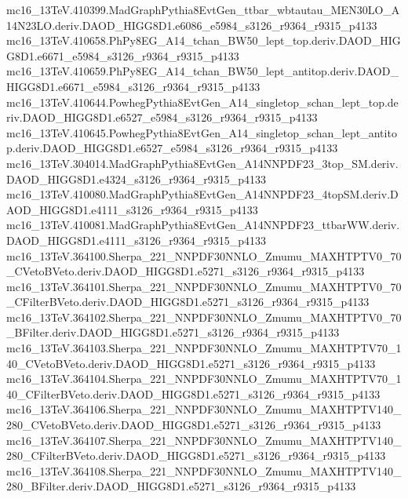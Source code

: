 \begin{footnotesize}
mc16\_13TeV.410399.MadGraphPythia8EvtGen\_ttbar\_wbtautau\_MEN30LO\_A14N23LO.deriv.DAOD\_HIGG8D1.e6086\_e5984\_s3126\_r9364\_r9315\_p4133 \\
mc16\_13TeV.410658.PhPy8EG\_A14\_tchan\_BW50\_lept\_top.deriv.DAOD\_HIGG8D1.e6671\_e5984\_s3126\_r9364\_r9315\_p4133 \\
mc16\_13TeV.410659.PhPy8EG\_A14\_tchan\_BW50\_lept\_antitop.deriv.DAOD\_HIGG8D1.e6671\_e5984\_s3126\_r9364\_r9315\_p4133 \\
mc16\_13TeV.410644.PowhegPythia8EvtGen\_A14\_singletop\_schan\_lept\_top.deriv.DAOD\_HIGG8D1.e6527\_e5984\_s3126\_r9364\_r9315\_p4133 \\
mc16\_13TeV.410645.PowhegPythia8EvtGen\_A14\_singletop\_schan\_lept\_antitop.deriv.DAOD\_HIGG8D1.e6527\_e5984\_s3126\_r9364\_r9315\_p4133 \\
mc16\_13TeV.304014.MadGraphPythia8EvtGen\_A14NNPDF23\_3top\_SM.deriv.DAOD\_HIGG8D1.e4324\_s3126\_r9364\_r9315\_p4133 \\
mc16\_13TeV.410080.MadGraphPythia8EvtGen\_A14NNPDF23\_4topSM.deriv.DAOD\_HIGG8D1.e4111\_s3126\_r9364\_r9315\_p4133 \\
mc16\_13TeV.410081.MadGraphPythia8EvtGen\_A14NNPDF23\_ttbarWW.deriv.DAOD\_HIGG8D1.e4111\_s3126\_r9364\_r9315\_p4133 \\
mc16\_13TeV.364100.Sherpa\_221\_NNPDF30NNLO\_Zmumu\_MAXHTPTV0\_70\_CVetoBVeto.deriv.DAOD\_HIGG8D1.e5271\_s3126\_r9364\_r9315\_p4133 \\
mc16\_13TeV.364101.Sherpa\_221\_NNPDF30NNLO\_Zmumu\_MAXHTPTV0\_70\_CFilterBVeto.deriv.DAOD\_HIGG8D1.e5271\_s3126\_r9364\_r9315\_p4133 \\
mc16\_13TeV.364102.Sherpa\_221\_NNPDF30NNLO\_Zmumu\_MAXHTPTV0\_70\_BFilter.deriv.DAOD\_HIGG8D1.e5271\_s3126\_r9364\_r9315\_p4133 \\
mc16\_13TeV.364103.Sherpa\_221\_NNPDF30NNLO\_Zmumu\_MAXHTPTV70\_140\_CVetoBVeto.deriv.DAOD\_HIGG8D1.e5271\_s3126\_r9364\_r9315\_p4133 \\
mc16\_13TeV.364104.Sherpa\_221\_NNPDF30NNLO\_Zmumu\_MAXHTPTV70\_140\_CFilterBVeto.deriv.DAOD\_HIGG8D1.e5271\_s3126\_r9364\_r9315\_p4133 \\
mc16\_13TeV.364106.Sherpa\_221\_NNPDF30NNLO\_Zmumu\_MAXHTPTV140\_280\_CVetoBVeto.deriv.DAOD\_HIGG8D1.e5271\_s3126\_r9364\_r9315\_p4133 \\
mc16\_13TeV.364107.Sherpa\_221\_NNPDF30NNLO\_Zmumu\_MAXHTPTV140\_280\_CFilterBVeto.deriv.DAOD\_HIGG8D1.e5271\_s3126\_r9364\_r9315\_p4133 \\
mc16\_13TeV.364108.Sherpa\_221\_NNPDF30NNLO\_Zmumu\_MAXHTPTV140\_280\_BFilter.deriv.DAOD\_HIGG8D1.e5271\_s3126\_r9364\_r9315\_p4133 \\

\end{footnotesize}
